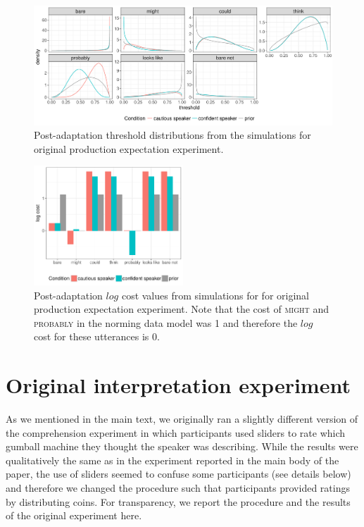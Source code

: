 \begin{figure}[h!]
  \includegraphics[width=\textwidth]{plots/fig-F2-adaptation-posterior-thresholds.pdf}
  \caption{Post-adaptation threshold distributions from the simulations for original production expectation experiment. \label{fig:post-exposure-thresholds-original}}
\end{figure}

\begin{figure}[h!]
\center
  \includegraphics[width=0.5\textwidth]{plots/fig-F3-adaptation-posterior-costs.pdf}
  \caption{Post-adaptation $log$ cost values from simulations for for original production expectation experiment. Note that the cost of \textsc{might} and \textsc{probably} 
  in the norming data model was 1 and therefore the $log$ cost for these utterances is 0.  \label{fig:post-exposure-costs-original}}
\end{figure}




\chapter{Original interpretation experiment}

As we mentioned in the main text, we originally ran a slightly different version of the comprehension experiment in which participants used sliders to rate which gumball machine they thought the speaker was describing. While the results were qualitatively the same as in the experiment reported in the main body of the paper, the use of sliders seemed to confuse some participants (see details below) and therefore we changed the procedure such that participants provided ratings by distributing coins. For transparency, we report the 
procedure and the results of the original experiment here.

